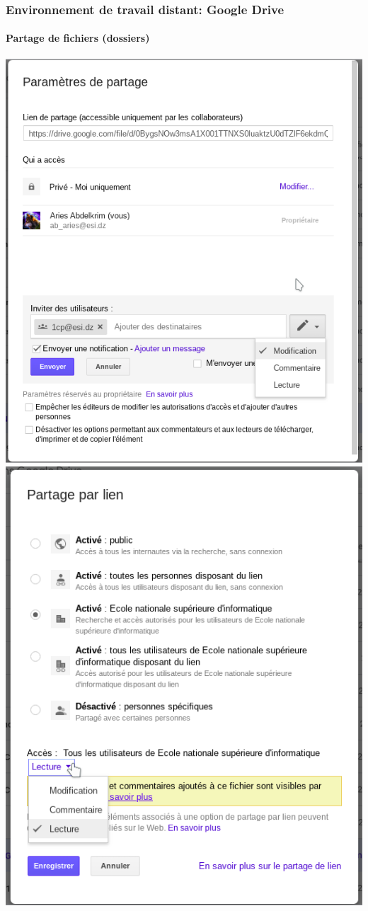 \documentclass{beamer}
\begin{document}
\begin{frame}
\frametitle{Environnement de travail distant: Google Drive}
\framesubtitle{Partage de fichiers (dossiers) }

\begin{center}
	\includegraphics[width=
	.45\textwidth]{../img/Bweb01-environnement/drive-share1.png}
	\includegraphics[width=
	.45\textwidth]{../img/Bweb01-environnement/drive-share2.png}
\end{center}

\end{frame}


%
% 
\end{document}
